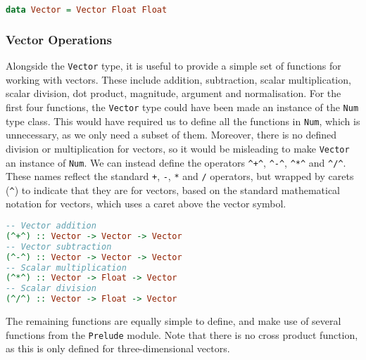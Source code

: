 \documentclass[../main.tex]{subfiles}
\begin{document}
            \begin{lstlisting}[language={Haskell}, label={lst:vector}, caption={The \texttt{Vector} 
                type definition.}]
data Vector = Vector Float Float\end{lstlisting}

            \subsubsection{Vector Operations}
                Alongside the \texttt{Vector} type, it is useful to provide a simple set of
                    functions for working with vectors.
                These include addition, subtraction, scalar multiplication, scalar division,
                    dot product, magnitude, argument and normalisation.
                For the first four functions, the \texttt{Vector} type could have been made an
                    instance of the \texttt{Num} type class.
                This would have required us to define all the functions in \texttt{Num}, which
                    is unnecessary, as we only need a subset of them.
                Moreover, there is no defined division or multiplication for vectors, so it
                    would be misleading to make \texttt{Vector} an instance of \texttt{Num}.
                We can instead define the operators \verb|^+^|, \verb|^-^|, \verb|^*^| and
                    \verb|^/^|.
                These names reflect the standard \verb|+|, \verb|-|, \verb|*| and \verb|/|
                    operators, but wrapped by carets (\verb|^|) to indicate that they are for
                    vectors, based on the standard mathematical notation for vectors, which uses a
                    caret above the vector symbol.

                \begin{lstlisting}[language={Haskell}, label={lst:vectorOps}, caption={The vector 
                    operators.}]
-- Vector addition
(^+^) :: Vector -> Vector -> Vector
-- Vector subtraction
(^-^) :: Vector -> Vector -> Vector
-- Scalar multiplication
(^*^) :: Vector -> Float -> Vector
-- Scalar division
(^/^) :: Vector -> Float -> Vector\end{lstlisting}

                The remaining functions are equally simple to define, and make use of several
                    functions from the \texttt{Prelude} module.
                Note that there is no cross product function, as this is only defined for
                    three-dimensional vectors.
\end{document}
